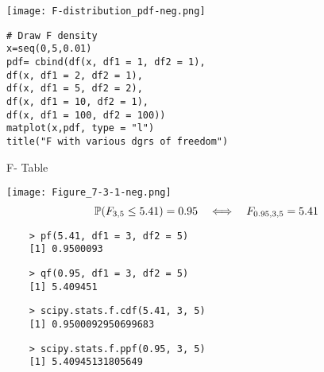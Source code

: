 \begin{frame}[fragile]
\begin{center}
\texttt{[image: F-distribution\_pdf-neg.png]}
\end{center}
\vfill
\begin{center}
\begin{minipage}{0.6\textwidth}
\begin{lstlisting}
# Draw F density
x=seq(0,5,0.01)
pdf= cbind(df(x, df1 = 1, df2 = 1),
df(x, df1 = 2, df2 = 1),
df(x, df1 = 5, df2 = 2),
df(x, df1 = 10, df2 = 1),
df(x, df1 = 100, df2 = 100))
matplot(x,pdf, type = "l")
title("F with various dgrs of freedom")
\end{lstlisting}
\end{minipage}
\end{center}
\end{frame}
\begin{frame}[fragile]{F- Table}
\begin{center}
	\texttt{[image: Figure\_7-3-1-neg.png]}
	\[
		\mathbb{P}(F_{3,5}\le 5.41) = 0.95 \quad\Longleftrightarrow\quad
		F_{0.95,3,5} = 5.41
	\]
	\begin{minipage}{0.4\textwidth}
	\begin{lstlisting}
	> pf(5.41, df1 = 3, df2 = 5)
	[1] 0.9500093
	\end{lstlisting}
	\end{minipage}
	\qquad\qquad
	\begin{minipage}{0.4\textwidth}
	\begin{lstlisting}
	> qf(0.95, df1 = 3, df2 = 5)
	[1] 5.409451
	\end{lstlisting}
	\end{minipage}
	\vspace{-1em}

	\begin{minipage}{0.4\textwidth}
	\begin{lstlisting}
	> scipy.stats.f.cdf(5.41, 3, 5)
	[1] 0.9500092950699683
	\end{lstlisting}
	\end{minipage}
	\qquad\qquad
	\begin{minipage}{0.4\textwidth}
	\begin{lstlisting}
	> scipy.stats.f.ppf(0.95, 3, 5)
	[1] 5.40945131805649
	\end{lstlisting}
	\end{minipage}
\end{center}
\end{frame}
